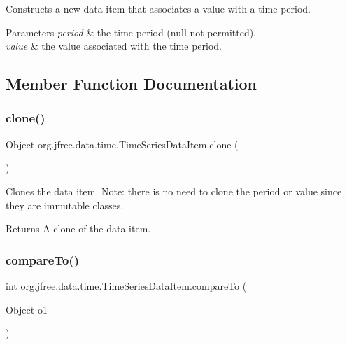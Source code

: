Constructs a new data item that associates a value with a time period.


\begin{DoxyParams}{Parameters}
{\em period} & the time period ({\ttfamily null} not permitted). \\
\hline
{\em value} & the value associated with the time period. \\
\hline
\end{DoxyParams}


\subsection{Member Function Documentation}
\mbox{\label{classorg_1_1jfree_1_1data_1_1time_1_1_time_series_data_item_a4a1e5b5a08f4f5937f8664c32d7131b2}} 
\subsubsection{\texorpdfstring{clone()}{clone()}}
{\footnotesize\ttfamily Object org.\+jfree.\+data.\+time.\+Time\+Series\+Data\+Item.\+clone (\begin{DoxyParamCaption}{ }\end{DoxyParamCaption})}

Clones the data item. Note\+: there is no need to clone the period or value since they are immutable classes.

\begin{DoxyReturn}{Returns}
A clone of the data item. 
\end{DoxyReturn}
\mbox{\label{classorg_1_1jfree_1_1data_1_1time_1_1_time_series_data_item_a2ef795d0a8bf1a0b9d48b8040a5a0026}} 
\subsubsection{\texorpdfstring{compare\+To()}{compareTo()}}
{\footnotesize\ttfamily int org.\+jfree.\+data.\+time.\+Time\+Series\+Data\+Item.\+compare\+To (\begin{DoxyParamCaption}\item[{Object}]{o1 }\end{DoxyParamCaption})}

